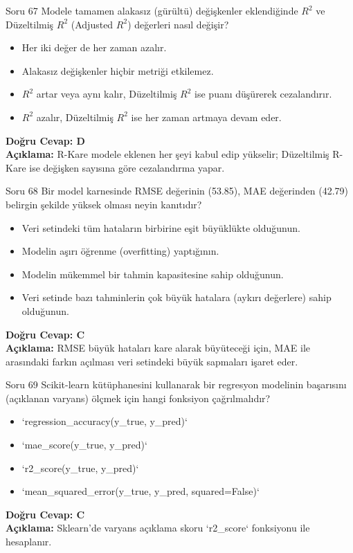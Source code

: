 \documentclass[12pt,a4paper]{article}
\begin{document}
\begin{testcard}{Soru 67}
    Modele tamamen alakasız (gürültü) değişkenler eklendiğinde $R^2$ ve Düzeltilmiş $R^2$ (Adjusted $R^2$) değerleri nasıl değişir?
    \begin{itemize}
        \item[A)] Her iki değer de her zaman azalır.
        \item[B)] Alakasız değişkenler hiçbir metriği etkilemez.
        \item[C)] $R^2$ artar veya aynı kalır, Düzeltilmiş $R^2$ ise puanı düşürerek cezalandırır.
        \item[D)] $R^2$ azalır, Düzeltilmiş $R^2$ ise her zaman artmaya devam eder.
    \end{itemize}
    \tcblower
    \textbf{Doğru Cevap: D} \\
    \textbf{Açıklama:} R-Kare modele eklenen her şeyi kabul edip yükselir; Düzeltilmiş R-Kare ise değişken sayısına göre cezalandırma yapar.
\end{testcard}

\begin{testcard}{Soru 68}
    Bir model karnesinde RMSE değerinin (53.85), MAE değerinden (42.79) belirgin şekilde yüksek olması neyin kanıtıdır?
    \begin{itemize}
        \item[A)] Veri setindeki tüm hataların birbirine eşit büyüklükte olduğunun.
        \item[B)] Modelin aşırı öğrenme (overfitting) yaptığının.
        \item[C)] Modelin mükemmel bir tahmin kapasitesine sahip olduğunun.
        \item[D)] Veri setinde bazı tahminlerin çok büyük hatalara (aykırı değerlere) sahip olduğunun.
    \end{itemize}
    \tcblower
    \textbf{Doğru Cevap: C} \\
    \textbf{Açıklama:} RMSE büyük hataları kare alarak büyüteceği için, MAE ile arasındaki farkın açılması veri setindeki büyük sapmaları işaret eder.
\end{testcard}

\begin{testcard}{Soru 69}
    Scikit-learn kütüphanesini kullanarak bir regresyon modelinin başarısını (açıklanan varyans) ölçmek için hangi fonksiyon çağrılmalıdır?
    \begin{itemize}
        \item[A)] `regression_accuracy(y_true, y_pred)`
        \item[B)] `mae_score(y_true, y_pred)`
        \item[C)] `r2_score(y_true, y_pred)`
        \item[D)] `mean_squared_error(y_true, y_pred, squared=False)`
    \end{itemize}
    \tcblower
    \textbf{Doğru Cevap: C} \\
    \textbf{Açıklama:} Sklearn'de varyans açıklama skoru `r2_score` fonksiyonu ile hesaplanır.
\end{testcard}
\end{document}
